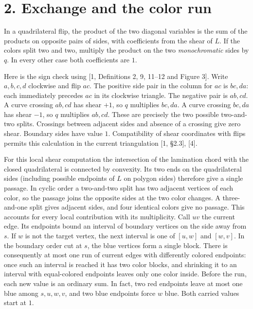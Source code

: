 \documentclass[11pt]{article}
\begin{document}
\section*{2. Exchange and the color run}

In a quadrilateral flip, the product of the two diagonal variables is the sum of the products on opposite pairs of sides, with coefficients from the shear of \(L\). If the colors split two and two, multiply the product on the two \emph{monochromatic} sides by \(q\). In every other case both coefficients are \(1\).

Here is the sign check using [1, Definitions 2, 9, 11--12 and Figure 3]. Write \(a,b,c,d\) clockwise and flip \(ac\). The positive side pair in the column for \(ac\) is \(bc,da\): each immediately precedes \(ac\) in its clockwise triangle. The negative pair is \(ab,cd\). A curve crossing \(ab,cd\) has shear \(+1\), so \(q\) multiplies \(bc,da\). A curve crossing \(bc,da\) has shear \(-1\), so \(q\) multiplies \(ab,cd\). These are precisely the two possible two-and-two splits. Crossings between adjacent sides and absence of a crossing give zero shear. Boundary sides have value \(1\). Compatibility of shear coordinates with flips permits this calculation in the current triangulation [1, \S2.3], [4].

For this local shear computation the intersection of the lamination chord with the closed quadrilateral is connected by convexity. Its two ends on the quadrilateral sides (including possible endpoints of \(L\) on polygon sides) therefore give a single passage. In cyclic order a two-and-two split has two adjacent vertices of each color, so the passage joins the opposite sides at the two color changes. A three-and-one split gives adjacent sides, and four identical colors give no passage. This accounts for every local contribution with its multiplicity.
Call \(uv\) the current edge. Its endpoints bound an interval of boundary vertices on the side away from \(s\). If \(w\) is not the target vertex, the next interval is one of \([u,w]\) and \([w,v]\). In the boundary order cut at \(s\), the blue vertices form a single block. There is consequently at most one run of current edges with differently colored endpoints: once such an interval is reached it has two color blocks, and shrinking it to an interval with equal-colored endpoints leaves only one color inside. Before the run, each new value is an ordinary sum. In fact, two red endpoints leave at most one blue among \(s,u,w,v\), and two blue endpoints force \(w\) blue. Both carried values start at \(1\).
\end{document}
